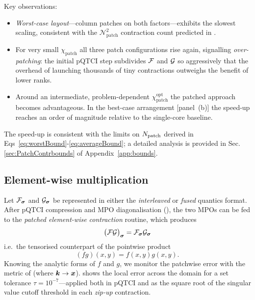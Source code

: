 Key observations:

\begin{itemize}
    \item \emph{Worst-case layout}—column patches on both factors—exhibits the slowest scaling, consistent with the \(\mathcal N_{\text{patch}}^{2}\) contraction count predicted in .
    \item For very small \(\chi_{\text{patch}}\) all three patch configurations rise again, signalling \emph{over-patching}: the initial pQTCI step subdivides \(\mathcal{F}\) and \(\mathcal{G}\) so aggressively that the overhead of launching thousands of tiny contractions outweighs the benefit of lower ranks.
    \item Around an intermediate, problem-dependent \(\chi_{\text{patch}}^{\mathrm{opt}}\) the patched approach becomes advantageous.  In the best-case arrangement [panel~(b)] the speed-up reaches an order of magnitude relative to the single-core baseline.
\end{itemize}

The speed-up is consistent with the limits on $N_{\text{patch}}$ derived in Eqs~\eqref{eq:worstBound}-\eqref{eq:averageBound}; a detailed analysis is provided in Sec.\ref{sec:PatchContrbounds} of Appendix~\ref{app:bounds}.


\subsection{Element-wise multiplication}

Let \(\mathcal{F}_{\boldsymbol{\sigma}}\) and \(\mathcal{G}_{\boldsymbol{\sigma}}\) be represented in either the
\emph{interleaved} or \emph{fused} quantics format.  
After pQTCI compression and MPO diagonalisation
(), the two MPOs can be fed to the \emph{patched
element-wise contraction} routine, which produces
\begin{equation}
 \bigl(\mathcal{F}\mathcal{G}\bigr)_{\boldsymbol{\sigma}} = \mathcal{F}_{\boldsymbol{\sigma}}\mathcal{G}_{\boldsymbol{\sigma}}
 \label{eq:elemMulTensor}
\end{equation} 
i.e.\ the tensorised counterpart of the pointwise product 
\begin{equation}
    (fg)(x,y) = f(x,y)g(x,y).
\end{equation}
Knowing the analytic forms of \(f\) and \(g\), we monitor the patchwise error with the metric of  (where $\boldsymbol{k} \to \boldsymbol{x}$).  
 shows the local error across the domain for a set tolerance \(\tau=10^{-7}\)—applied both in pQTCI and as the square root of the singular value cutoff threshold in each \emph{zip-up} contraction.

